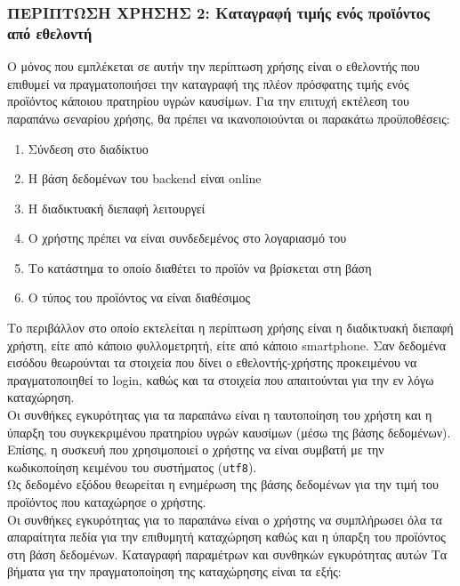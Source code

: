 \subsubsection{ΠΕΡΙΠΤΩΣΗ ΧΡΗΣΗΣ 2: Καταγραφή τιμής ενός προϊόντος από εθελοντή}
Ο μόνος που εμπλέκεται σε αυτήν την περίπτωση χρήσης είναι ο εθελοντής που επιθυμεί να πραγματοποιήσει την καταγραφή της πλέον πρόσφατης τιμής ενός προϊόντος κάποιου πρατηρίου υγρών καυσίμων.
Για την επιτυχή εκτέλεση του παραπάνω σεναρίου χρήσης, θα πρέπει να ικανοποιούνται οι παρακάτω προϋποθέσεις:
\begin{enumerate}
	\item Σύνδεση στο διαδίκτυο
	\item Η βάση δεδομένων του backend είναι online
	\item Η διαδικτυακή διεπαφή λειτουργεί
	\item Ο χρήστης πρέπει να είναι συνδεδεμένος στο λογαριασμό του
	\item Το κατάστημα το οποίο διαθέτει το προϊόν να βρίσκεται στη βάση
	\item O τύπος του προϊόντος να είναι διαθέσιμος
\end{enumerate}
Το περιβάλλον στο οποίο εκτελείται η περίπτωση χρήσης είναι η διαδικτυακή διεπαφή χρήστη, είτε από κάποιο φυλλομετρητή, είτε από κάποιο smartphone.
Σαν δεδομένα εισόδου θεωρούνται τα στοιχεία που δίνει ο εθελοντής-χρήστης προκειμένου να πραγματοποιηθεί το login, καθώς και τα στοιχεία που απαιτούνται για την εν λόγω καταχώρηση. \\
Οι συνθήκες εγκυρότητας για τα παραπάνω είναι η ταυτοποίηση του χρήστη και η ύπαρξη του συγκεκριμένου πρατηρίου υγρών καυσίμων (μέσω της βάσης δεδομένων). Επίσης, η συσκευή που χρησιμοποιεί ο χρήστης να είναι συμβατή με την κωδικοποίηση κειμένου του συστήματος (\texttt{utf8}).\\
Ως δεδομένο εξόδου θεωρείται η ενημέρωση της βάσης δεδομένων για την τιμή του προϊόντος που καταχώρησε ο χρήστης. \\
Οι συνθήκες εγκυρότητας για το παραπάνω είναι ο χρήστης να συμπλήρωσει όλα τα απαραίτητα πεδία για την επιθυμητή καταχώρηση καθώς και η ύπαρξη του προϊόντος στη βάση δεδομένων.
Καταγραφή παραμέτρων και συνθηκών εγκυρότητας αυτών
Τα βήματα για την πραγματοποίηση της καταχώρησης είναι τα εξής:
